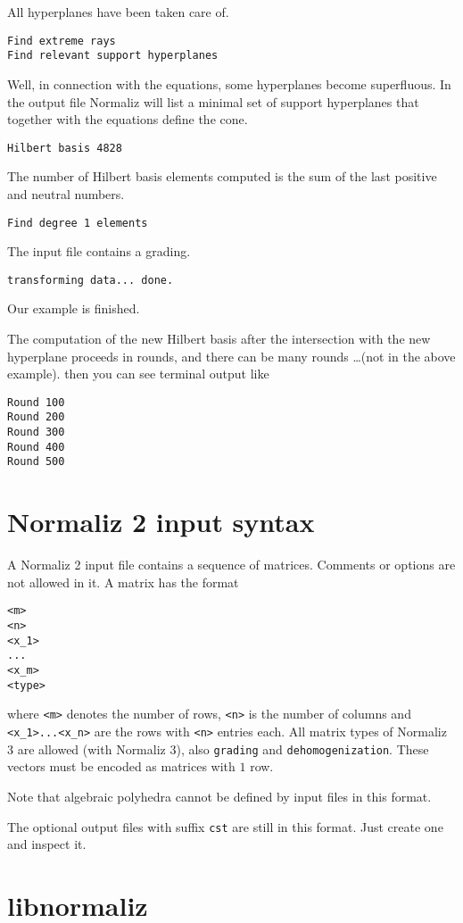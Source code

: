 \documentclass[12pt,a4paper]{scrartcl}
\theoremstyle{definition}
\begin{document}
All hyperplanes have been taken care of.
\begin{Verbatim}
Find extreme rays
Find relevant support hyperplanes
\end{Verbatim}
Well, in connection with the equations, some hyperplanes become superfluous. In the output file Normaliz will list a minimal set of support hyperplanes that together with the equations define the cone.
\begin{Verbatim}
Hilbert basis 4828
\end{Verbatim}
The number of Hilbert basis elements computed is the sum of the last positive and neutral numbers.
\begin{Verbatim}
Find degree 1 elements
\end{Verbatim}
The input file contains a grading.
\begin{Verbatim}
transforming data... done.
\end{Verbatim}
Our example is finished.

The computation of the new Hilbert basis after the intersection with the new hyperplane proceeds in rounds, and there can be many rounds \dots (not in the above example). then you can see terminal output like
\begin{Verbatim}
Round 100
Round 200
Round 300
Round 400
Round 500
\end{Verbatim}

\section{Normaliz 2 input syntax}\label{OldSyntax}

A Normaliz 2 input file contains a sequence of matrices. Comments or options are not allowed in it. A matrix has the format
\begin{Verbatim}
<m>
<n>
<x_1>
...
<x_m>
<type>
\end{Verbatim}
where \verb|<m>| denotes the number of rows, \verb|<n>| is the number of columns and \verb|<x_1>...<x_n>| are the rows with \verb|<n>| entries each. All matrix types of Normaliz 3 are allowed (with Normaliz 3), also \verb|grading| and \verb|dehomogenization|. These vectors must be encoded as matrices with $1$ row.

Note that algebraic polyhedra cannot be defined by input files in this format.

The optional output files  with suffix \verb|cst| are still in this format. Just create one and inspect it.

\section{libnormaliz}\label{libnorm}
\end{document}
